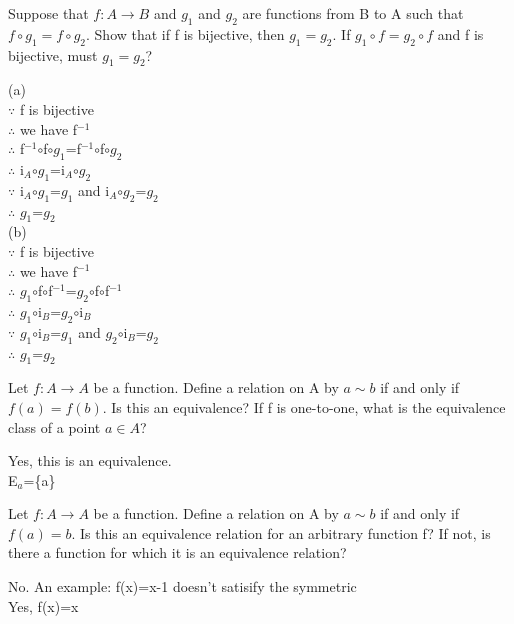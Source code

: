 \documentclass[11pt, a4paper, UTF8]{ctexart}
\begin{document}
\begin{problem}[UD:15.11]
Suppose that \(f:A \rightarrow B\) and \(g_{1}\) and \(g_{2}\) are functions from B to A such that \(f \circ g_{1} = f \circ g_{2}\). Show that if f is bijective, then \(g_{1} = g_{2}\). If \(g_{1} \circ f = g_{2} \circ f\) and f is bijective, must \(g_{1} = g_{2}\)?
\end{problem}
\begin{solution}
(a)\\
$\because$ f is bijective\\
$\therefore$ we have f$^{-1}$\\
$\therefore$ f$^{-1}$$\circ$f$\circ$$g_1$=f$^{-1}$$\circ$f$\circ$$g_2$\\
$\therefore$ i$_A$$\circ$$g_1$=i$_A$$\circ$$g_2$\\
$\because$ i$_A$$\circ$$g_1$=$g_1$ and i$_A$$\circ$$g_2$=$g_2$\\
$\therefore$ $g_1$=$g_2$\\
(b)\\
$\because$ f is bijective\\
$\therefore$ we have f$^{-1}$\\
$\therefore$ $g_1$$\circ$f$\circ$f$^{-1}$=$g_2$$\circ$f$\circ$f$^{-1}$\\
$\therefore$ $g_1$$\circ$i$_B$=$g_2$$\circ$i$_B$\\
$\because$ $g_1$$\circ$i$_B$=$g_1$ and $g_2$$\circ$i$_B$=$g_2$\\
$\therefore$ $g_1$=$g_2$\\
\end{solution}

\begin{problem}[UD:15.12]
Let \(f:A \rightarrow A\) be a function. Define a relation on A by \(a \sim b\) if and only if \(f(a) = f(b)\). Is this an equivalence? If f is one-to-one, what is the equivalence class of a point \(a \in A\)?
\end{problem}
\begin{solution}
Yes, this is an equivalence.\\
E$_a$=\{a\}\\

\end{solution}


\begin{problem}[UD:15.13]
Let \(f:A \rightarrow A\) be a function. Define a relation on A by \(a \sim b\) if and only if \(f(a) = b\). Is this an equivalence relation for an arbitrary function f? If not, is there a function for which it is an equivalence relation?
\end{problem}
\begin{solution}
No. An example: f(x)=x-1 doesn't satisify the symmetric\\
Yes, f(x)=x\\
\end{solution}
\end{document}
